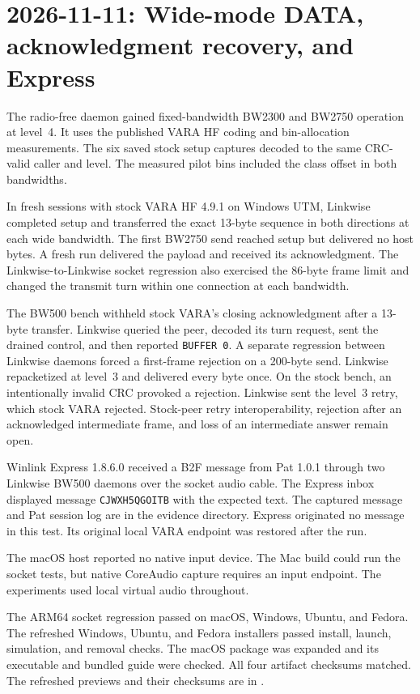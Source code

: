 \documentclass[11pt,a4paper]{article}
\newcommand{\pathtext}[1]{\path{#1}}
\begin{document}
\section{2026-11-11: Wide-mode DATA, acknowledgment recovery, and Express}

The radio-free daemon gained fixed-bandwidth BW2300 and BW2750 operation
at level~4. It uses the published VARA HF coding and bin-allocation
measurements. The six saved stock setup captures decoded to the same
CRC-valid caller and level. The measured pilot bins included the class
offset in both bandwidths.

In fresh sessions with stock VARA HF 4.9.1 on Windows UTM, Linkwise
completed setup and transferred the exact 13-byte sequence in both
directions at each wide bandwidth. The first BW2750 send reached setup
but delivered no host bytes. A fresh run delivered the payload and
received its acknowledgment. The Linkwise-to-Linkwise socket regression
also exercised the 86-byte frame limit and changed the transmit turn
within one connection at each bandwidth.

The BW500 bench withheld stock VARA's closing acknowledgment after a
13-byte transfer. Linkwise queried the peer, decoded its turn request,
sent the drained control, and then reported \texttt{BUFFER 0}. A separate
regression between Linkwise daemons forced a first-frame rejection on a
200-byte send. Linkwise repacketized at level~3 and delivered every byte
once. On the stock bench, an intentionally invalid CRC provoked a
rejection. Linkwise sent the level~3 retry, which stock VARA rejected.
Stock-peer retry interoperability, rejection after an acknowledged
intermediate frame, and loss of an intermediate answer remain open.

Winlink Express 1.8.6.0 received a B2F message from Pat 1.0.1 through two
Linkwise BW500 daemons over the socket audio cable. The Express inbox
displayed message \texttt{CJWXH5QGOITB} with the expected text. The
captured message and Pat session log are in the evidence directory.
Express originated no message in this test. Its original local VARA
endpoint was restored after the run.

The macOS host reported no native input device. The Mac build could
run the socket tests, but native CoreAudio capture requires an input
endpoint. The experiments used local virtual audio throughout.

The ARM64 socket regression passed on macOS, Windows, Ubuntu, and
Fedora. The refreshed Windows, Ubuntu, and Fedora installers passed
install, launch, simulation, and removal checks. The macOS package
was expanded and its executable and bundled guide were checked.
All four artifact checksums matched. The refreshed previews and their
checksums are in \pathtext{dist/radio-free-refresh/}.
\end{document}

